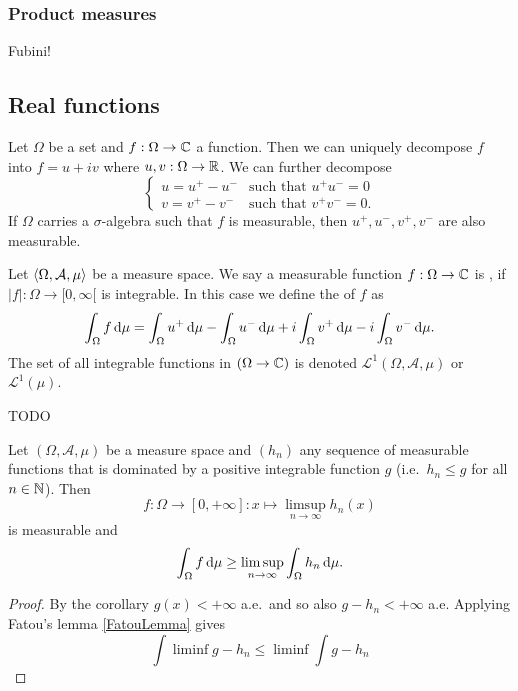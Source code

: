 \subsubsection{Product measures}
Fubini!

\subsection{Real functions}
Let $\Omega$ be a set and $f:\Omega \to \mathbb{C}$ a function.  Then we can uniquely decompose $f$ into $f= u+iv$ where $u,v: \Omega\to \mathbb{R}$. We can further decompose
\[ \begin{cases}
u = u^+ - u^- & \text{such that $u^+u^- = 0$} \\
v = v^+ - v^- & \text{such that $v^+v^- = 0$.}
\end{cases} \]
If $\Omega $ carries a $\sigma$-algebra such that $f$ is measurable, then $u^+,u^-,v^+,v^-$ are also measurable.
\begin{definition}
Let $\left\langle \Omega, \mathcal{A},\mu \right\rangle$ be a measure space. We say a measurable function $f: \Omega \to \mathbb{C}$ is , if $|f|:\Omega\to [0,\infty[$ is integrable. In this case we define the  of $f$ as
\[ \int_\Omega f\operatorname{d \!}{\mu} = \int_\Omega u^+\operatorname{d \!}{\mu} - \int_\Omega u^-\operatorname{d \!}{\mu} + i\int_\Omega v^+\operatorname{d \!}{\mu} - i\int_\Omega v^-\operatorname{d \!}{\mu}. \]
The set of all integrable functions in $(\Omega \to \mathbb{C})$ is denoted $\mathcal{L} ^1(\Omega,\mathcal{A},\mu)$ or $\mathcal{L} ^1(\mu)$.
\end{definition}

TODO
\begin{proposition}
Let $(\Omega, \mathcal{A}, \mu)$ be a measure space and $(h_n)$ any sequence of measurable functions that is dominated by a positive integrable function $g$ (i.e.\ $h_n\leq g$ for all $n\in\mathbb{N}$). Then
\[ f: \Omega\to[0,+\infty]: x\mapsto \limsup_{n\to\infty}h_n(x) \]
is measurable and
\[ \int_\Omega f\operatorname{d \!}{\mu} \geq \limsup_{n\to\infty}\int_\Omega h_n\operatorname{d \!}{\mu}. \]
\end{proposition}
\begin{proof}
By the corollary $g(x)<+\infty$ a.e.\ and so also $g-h_n<+\infty$ a.e. Applying Fatou's lemma \ref{FatouLemma} gives
\[ \int\liminf g-h_n \leq \liminf\int g-h_n\]
\end{proof}

